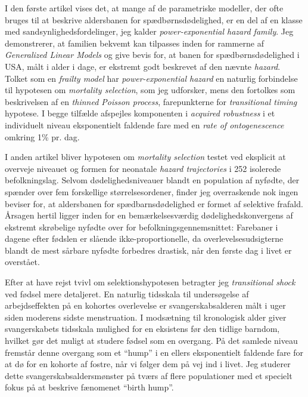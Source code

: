\documentclass[
  10pt, twoside
]{book}
\begin{document}
I den første artikel vises det, at mange af de parametriske modeller, der ofte bruges til at beskrive aldersbanen for spædbørnsdødelighed, er en del af en klasse med sandsynlighedsfordelinger, jeg kalder \emph{power-exponential hazard family}. Jeg demonstrerer, at familien bekvemt kan tilpasses inden for rammerne af \emph{Generalized Linear Models} og give bevis for, at banen for spædbørnsdødelighed i USA, målt i alder i dage, er ekstremt godt beskrevet af den nævnte \emph{hazard}. Tolket som en \emph{frailty model} har \emph{power-exponential hazard} en naturlig forbindelse til hypotesen om \emph{mortality selection}, som jeg udforsker, mens den fortolkes som beskrivelsen af en \emph{thinned Poisson process}, farepunkterne for \emph{transitional timing} hypotese. I begge tilfælde afspejles komponenten i \emph{acquired robustness} i et individuelt niveau eksponentielt faldende fare med en \emph{rate of ontogenescence} omkring 1\% pr. dag.

I anden artikel bliver hypotesen om \emph{mortality selection} testet ved eksplicit at overveje niveauet og formen for neonatale \emph{hazard trajectories} i 252 isolerede befolkningslag. Selvom dødelighedsniveauer blandt en population af nyfødte, der spænder over fem forskellige størrelsesordener, finder jeg overraskende nok ingen beviser for, at aldersbanen for spædbarnsdødelighed er formet af selektive frafald. Årsagen hertil ligger inden for en bemærkelsesværdig dødelighedskonvergens af ekstremt skrøbelige nyfødte over for befolkningsgennemsnittet: Farebaner i dagene efter fødslen er slående ikke-proportionelle, da overlevelsesudsigterne blandt de mest sårbare nyfødte forbedres drastisk, når den første dag i livet er overstået.

Efter at have rejst tvivl om selektionshypotesen betragter jeg \emph{transitional shock} ved fødsel mere detaljeret. En naturlig tidsskala til undersøgelse af arbejdseffekten på en kohortes overlevelse er svangerskabsalderen målt i uger siden moderens sidste menstruation. I modsætning til kronologisk alder giver svangerskabets tidsskala mulighed for en eksistens før den tidlige barndom, hvilket gør det muligt at studere fødsel som en overgang. På det samlede niveau fremstår denne overgang som et ``hump'' i en ellers eksponentielt faldende fare for at dø for en kohorte af fostre, når vi følger dem på vej ind i livet. Jeg studerer dette svangerskabsaldersmønster på tværs af flere populationer med et specielt fokus på at beskrive fænomenet ``birth hump''.

\clearpage
\end{document}
